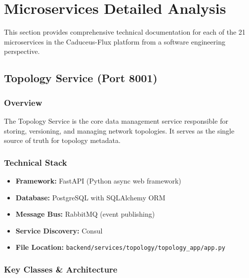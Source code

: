 \documentclass[10pt,a4paper]{article}
\begin{document}
\section{Microservices Detailed Analysis}

This section provides comprehensive technical documentation for each of the 21 microservices in the Caduceus-Flux platform from a software engineering perspective.

\subsection{Topology Service (Port 8001)}

\subsubsection{Overview}
The Topology Service is the core data management service responsible for storing, versioning, and managing network topologies. It serves as the single source of truth for topology metadata.

\subsubsection{Technical Stack}
\begin{itemize}
\item \textbf{Framework:} FastAPI (Python async web framework)
\item \textbf{Database:} PostgreSQL with SQLAlchemy ORM
\item \textbf{Message Bus:} RabbitMQ (event publishing)
\item \textbf{Service Discovery:} Consul
\item \textbf{File Location:} \texttt{backend/services/topology/topology\_app/app.py}
\end{itemize}

\subsubsection{Key Classes \& Architecture}
\end{document}
